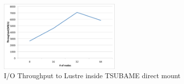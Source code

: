 \documentclass[JIP,draft]{ipsj}
\begin{document}

\begin{figure}[tb]
	\centering
	\includegraphics[width=6cm]{throughput_tsubame}
	\caption{I/O Throughput to Lustre inside TSUBAME direct mount}
	\label{throughput TSUBAME}
\end{figure}
\end{document}
